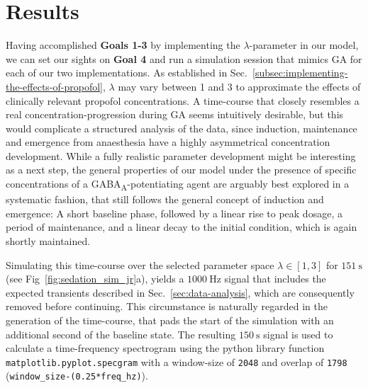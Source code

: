 \chapter{Results}\label{ch:results}
Having accomplished \textbf{Goals 1-3} by implementing the $\lambda$-parameter in our model,
we can set our sights on \textbf{Goal 4} and run a simulation session that mimics GA for each of our two implementations.
As established in Sec.~\ref{subsec:implementing-the-effects-of-propofol},
$\lambda$ may vary between 1 and 3 to approximate the effects of clinically relevant propofol concentrations.
A time-course that closely resembles a real concentration-progression during GA seems intuitively desirable,
but this would complicate a structured analysis of the data, since induction, maintenance and emergence from anaesthesia
have a highly asymmetrical concentration development.
While a fully realistic parameter development might be interesting as a next step,
the general properties of our model under the presence of specific
concentrations of a GABA\textsubscript{A}-potentiating agent
are arguably best explored in a systematic fashion, that still follows the general concept of induction and emergence:
A short baseline phase, followed by a linear rise to peak dosage,
a period of maintenance, and a linear decay to the initial condition,
which is again shortly maintained.


Simulating this time-course over the selected parameter space
$ \lambda \in \left[ 1, 3 \right] $ for $\SI{151}{\second}$ (see Fig~\ref{fig:sedation_sim_jr}a),
yields a $\SI{1000}{\hertz}$ signal that includes the expected transients described in Sec.~\ref{sec:data-analysis},
which are consequently removed before continuing.
This circumstance is naturally regarded in the generation of the time-course,
that pads the start of the simulation with an additional second of the baseline state.
The resulting $\SI{150}{\second}$ signal is used to calculate a time-frequency spectrogram
using the python library function \texttt{matplotlib.pyplot.specgram} with a window-size of \texttt{2048}
and overlap of \texttt{1798} (\texttt{window\_size-(0.25*freq\_hz)}).

\newtoggle{drawLocRoc}

\toggletrue{drawLocRoc}
\def\simRunName{JR_SEDATION_150}
\def\simRunTime{151}
\def\locStart{1.1}
\def\locST{10.07}%
\def\locEnd{2.07}
\def\locET{40.38}%
\def\rocStart{2.0}
\def\rocST{112.88}%
\def\rocEnd{1.00}
\def\rocET{144.46}%
